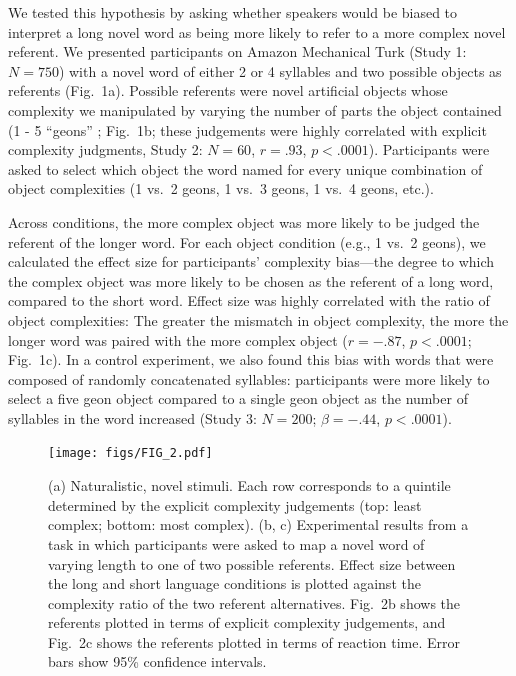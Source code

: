 \documentclass[12pt]{article}
\begin{document}
We tested this hypothesis by asking whether speakers would be biased to interpret a long novel word as being more likely to refer to a more complex novel referent. We presented participants on Amazon Mechanical Turk (Study 1: $N=750$) with a novel word of either 2 or 4 syllables and two possible objects as referents (Fig.\ 1a). Possible referents were novel artificial objects whose complexity we manipulated by varying the number of parts the object contained (1 - 5 ``geons'' \cite{biederman1987}; Fig.\ 1b; these judgements were highly correlated with explicit complexity judgments, Study 2: $N = 60$, $r = .93$, $p < .0001$). Participants were asked to select which object the word named for every unique combination of object complexities (1 vs.\ 2 geons, 1 vs.\ 3 geons, 1 vs.\ 4 geons, etc.).

Across conditions, the more complex object was more likely to be judged the referent of the longer word. For each object condition (e.g., 1 vs.\ 2 geons), we calculated the effect size for participants' complexity bias---the degree to which the complex object was more likely to be chosen as the referent of a long word, compared to the short word.  Effect size was highly correlated with the ratio of object complexities: The greater the mismatch in object complexity, the more the longer word was paired with the more complex object ($r = -.87$, $p < .0001$; Fig.\ 1c). In a control experiment, we also found this bias with words that were composed of randomly concatenated syllables: participants were more likely to select a five geon object compared to a single geon object as the number of syllables in the word increased (Study 3: $N=200$; $\beta=-.44$, $p <.0001$).
					
\begin{figure}[ht!]
\begin{center}
\texttt{[image: figs/FIG\_2.pdf]}
\caption{(a) Naturalistic, novel stimuli. Each row corresponds to a quintile determined by the explicit complexity judgements (top: least complex; bottom: most complex). (b, c) Experimental results from a task in which participants were asked to map a novel word of varying length to one of two possible referents. Effect size between the long and short language conditions is plotted against the complexity ratio of the two referent alternatives. Fig.\ 2b shows the referents plotted in terms of explicit complexity judgements, and Fig.\ 2c shows the referents plotted in terms of reaction time. Error bars show 95\% confidence intervals.}
\end{center}
\label{fig:real_objs}
\end{figure}
\end{document}
